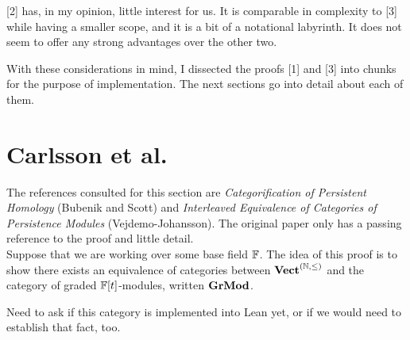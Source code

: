 [2] has, in my opinion, little interest for us. It is comparable in complexity to [3] while having a smaller scope, and it is a bit of a notational labyrinth. It does not seem to offer any strong advantages over the other two. 


With these considerations in mind, I dissected the proofs [1] and [3] into chunks for the purpose of implementation. The next sections go into detail about each of them. 



\section{Carlsson et al.}

The references consulted for this section are \textit{Categorification of Persistent Homology} (Bubenik and Scott) and \textit{Interleaved Equivalence of Categories of Persistence Modules} (Vejdemo-Johansson). The original paper only has a passing reference to the proof and little detail.  \\

Suppose that we are working over some base field $\mathbb{F}$. The idea of this proof is to show there exists an equivalence of categories between ${\normalfont\textbf{Vect}}^{(\mathbb{N}, \leq)}$ and the category of graded $\mathbb{F}[t]$-modules, written ${\normalfont\textbf{GrMod}}$. 

\begin{remark}
	Need to ask if this category is implemented into Lean yet, or if we would need to establish that fact, too. 
\end{remark}

